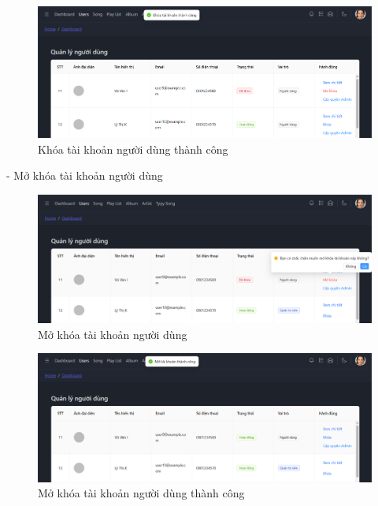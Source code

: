 \begin{figure}[H]
    \centering
    \includegraphics[width=1\textwidth]{imgs/chap5/ql_nguoi_dung_4.png}
    \caption{Khóa tài khoản người dùng thành công}
\end{figure}

- Mở khóa tài khoản người dùng
\begin{figure}[H]
    \centering
    \includegraphics[width=1\textwidth]{imgs/chap5/ql_nguoi_dung_7.png}
    \caption{Mở khóa tài khoản người dùng}
\end{figure}
\begin{figure}[H]
    \centering
    \includegraphics[width=1\textwidth]{imgs/chap5/ql_nguoi_dung_8.png}
    \caption{Mở khóa tài khoản người dùng thành công}
\end{figure}


